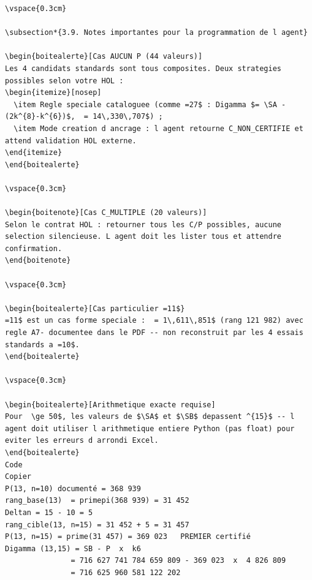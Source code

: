 \documentclass[11pt,a4paper]{article}
\newcommand{\SA}{\mathrm{S}_A}
\newcommand{\SB}{\mathrm{S}_B}
\begin{document}
\begin{Verbatim}[fontsize=\footnotesize]
\vspace{0.3cm}

\subsection*{3.9. Notes importantes pour la programmation de l agent}

\begin{boitealerte}[Cas AUCUN P (44 valeurs)]
Les 4 candidats standards sont tous composites. Deux strategies possibles selon votre HOL :
\begin{itemize}[nosep]
  \item Regle speciale cataloguee (comme =27$ : Digamma $= \SA - (2k^{8}-k^{6})$,  = 14\,330\,707$) ;
  \item Mode creation d ancrage : l agent retourne C_NON_CERTIFIE et attend validation HOL externe.
\end{itemize}
\end{boitealerte}

\vspace{0.3cm}

\begin{boitenote}[Cas C_MULTIPLE (20 valeurs)]
Selon le contrat HOL : retourner tous les C/P possibles, aucune selection silencieuse. L agent doit les lister tous et attendre confirmation.
\end{boitenote}

\vspace{0.3cm}

\begin{boitealerte}[Cas particulier =11$}
=11$ est un cas forme speciale :  = 1\,611\,851$ (rang 121 982) avec regle A7- documentee dans le PDF -- non reconstruit par les 4 essais standards a =10$.
\end{boitealerte}

\vspace{0.3cm}

\begin{boitealerte}[Arithmetique exacte requise]
Pour  \ge 50$, les valeurs de $\SA$ et $\SB$ depassent ^{15}$ -- l agent doit utiliser l arithmetique entiere Python (pas float) pour eviter les erreurs d arrondi Excel.
\end{boitealerte}
Code 
Copier 
P(13, n=10) documenté = 368 939 
rang_base(13)  = primepi(368 939) = 31 452 
Deltan = 15 - 10 = 5 
rang_cible(13, n=15) = 31 452 + 5 = 31 457 
P(13, n=15) = prime(31 457) = 369 023   PREMIER certifié 
Digamma (13,15) = SB - P  x  k6 
               = 716 627 741 784 659 809 - 369 023  x  4 826 809 
               = 716 625 960 581 122 202 
\end{Verbatim}
\medskip
\end{document}
